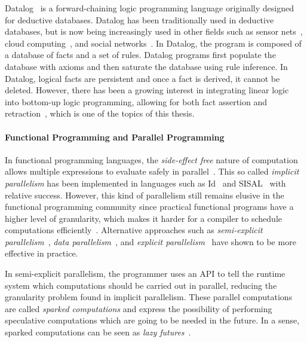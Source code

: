 Datalog~\cite{Ramakrishnan93asurvey,Ullman:1990:PDK:533142} is a
forward-chaining logic programming language originally designed for deductive
databases. Datalog has been traditionally used in deductive databases, but is
now being increasingly used in other fields such as sensor
nets~\cite{Chu:2007:DID:1322263.1322281}, cloud computing~\cite{alvaro:boom},
and social networks~\cite{Seo:2013:DSD:2556549.2556572}.  In Datalog, the
program is composed of a database of facts and a set of rules.  Datalog programs
first populate the database with axioms and then saturate the database using
rule inference. In Datalog, logical facts are persistent and once a fact is
derived, it cannot be deleted. However, there has been a growing interest in
integrating linear logic~\cite{girard-87} into bottom-up logic programming,
allowing for both fact assertion and
retraction~\cite{Chang03ajudgmental,Lopez:2005:MCL:1069774.1069778,simmons-lla,cruz-iclp14},
which is one of the topics of this thesis.

\paragraph{Functional Programming and Parallel Programming}

In functional programming languages, the \emph{side-effect free} nature of
computation allows multiple expressions to evaluate safely in
parallel~\cite{Loidl:2003}. This so called \emph{implicit parallelism} has been
implemented in languages such as Id~\cite{Nikhil93anoverview} and
SISAL~\cite{gaudiot2001sisal} with relative success. However, this kind of
parallelism still remains elusive in the functional programming community since
practical functional programs have a higher level of granularity, which makes it
harder for a compiler to schedule computations
efficiently~\cite{haskell_tutorial}.  Alternative approaches such as
\emph{semi-explicit parallelism}~\cite{Marlow:2010}, \emph{data
parallelism}~\cite{Blelloch:1996:PPA:227234.227246}, and \emph{explicit
parallelism}~\cite{harris2005composable} have shown to be more effective in
practice.

In semi-explicit parallelism, the programmer uses an API to tell the runtime
system which computations should be carried out in parallel, reducing the
granularity problem found in implicit parallelism. These parallel computations
are called \emph{sparked computations} and express the possibility of performing
speculative computations which are going to be needed in the future. In a sense,
sparked computations can be seen as \emph{lazy futures}~\cite{Baker:1977}.

